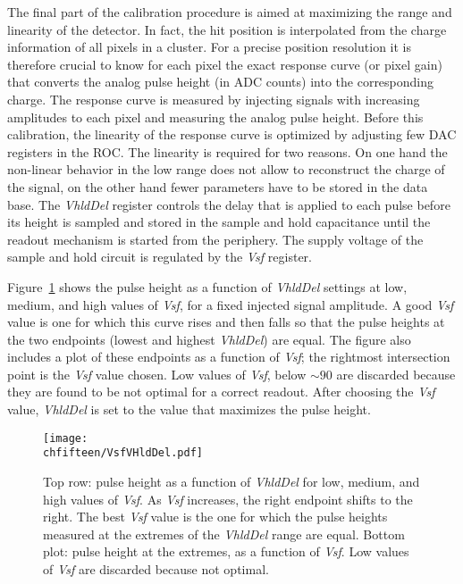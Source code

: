 The final part of the calibration procedure is aimed at maximizing the range and linearity of the detector.
In fact, the hit position is interpolated from the charge information of all pixels in a cluster. For a precise position resolution it is therefore crucial to know for each pixel the exact response curve (or pixel gain) that converts the analog pulse height (in ADC counts) into the corresponding charge.
The response curve is measured by injecting signals with increasing amplitudes to each pixel and measuring the analog pulse height.
Before this calibration, the linearity of the response curve is optimized by adjusting few DAC registers in the ROC.
The linearity is required for two reasons. On one hand the non-linear behavior in the low range does not allow to reconstruct the charge of the signal, on the other hand fewer parameters have to be stored in the data base.
The \textit{VhldDel} register controls the delay that is applied to each pulse before its height is sampled and stored in the sample and hold capacitance until the readout mechanism is started from the periphery.
The supply voltage of the sample and hold circuit is regulated by the \textit{Vsf} register.

Figure~\ref{fig:VhldDel} shows the pulse height as a function of \textit{VhldDel} settings at low, medium, and high values of \textit{Vsf}, for a fixed injected signal amplitude.
A good \textit{Vsf} value is one for which this curve rises and then falls so that the pulse heights at the two endpoints (lowest and highest \textit{VhldDel}) are equal.
The figure also includes a plot of these endpoints as a function of \textit{Vsf}; the rightmost intersection point is the \textit{Vsf} value chosen. Low values of \textit{Vsf}, below $\sim 90$ are discarded because they are found to be not optimal for a correct readout. After choosing the \textit{Vsf} value, \textit{VhldDel} is set to the value that maximizes the pulse height.

\begin{figure}[!htb]
\begin{center}
 \texttt{[image: \\chfifteen/VsfVHldDel.pdf]}
 \end{center}
 \caption{Top row: pulse height as a function of \textit{VhldDel} for low, medium, and high values of \textit{Vsf}. As \textit{Vsf} increases, the right endpoint shifts to the right.
 The best \textit{Vsf} value is the one for which the pulse heights measured at the extremes of the \textit{VhldDel} range are equal.
 Bottom plot: pulse height at the extremes, as a function of \textit{Vsf}. Low values of \textit{Vsf} are discarded because not optimal.}
 \label{fig:VhldDel}
\end{figure}

